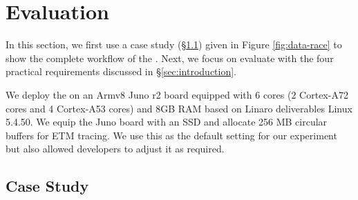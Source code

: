 \section{Evaluation} \label{sec:evaluation}


In this section, we first use a case study (\S\ref{subsec:eva-casestudy}) given
in Figure \ref{fig:data-race} to show the complete workflow of the \TheName. 
Next, we focus on evaluate \TheName{} with the four practical requirements
discussed in \S\ref{sec:introduction}.

We deploy the \TheName on an Armv8 Juno r2 board equipped with 6 cores (2
Cortex-A72 cores and 4 Cortex-A53 cores) and 8GB RAM based on Linaro
deliverables Linux 5.4.50. We equip the Juno board with an SSD and allocate
256 MB circular buffers for ETM tracing. We use this as the default setting for
our experiment but also allowed developers to adjust it as required.

\subsection{Case Study} \label{subsec:eva-casestudy}


